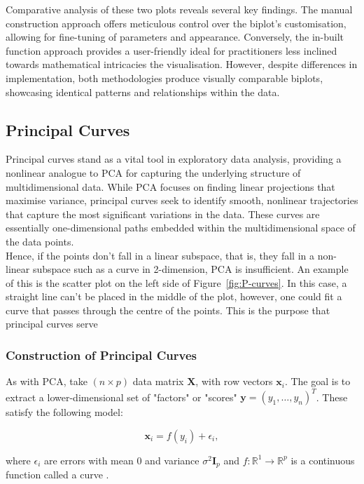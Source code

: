 \documentclass{article}\usepackage[]{graphicx}\usepackage[]{xcolor}
\numberwithin{equation}{section}
\begin{document}
\noindent Comparative analysis of these two plots reveals several key findings. The manual construction approach offers meticulous control over the biplot's customisation, allowing for fine-tuning of parameters and appearance. Conversely, the in-built function approach provides a user-friendly ideal for practitioners less inclined towards mathematical intricacies the visualisation. However, despite differences in implementation, both methodologies produce visually comparable biplots, showcasing identical patterns and relationships within the data.

\subsection{Principal Curves}

\noindent Principal curves stand as a vital tool in exploratory data analysis, providing a nonlinear analogue to PCA for capturing the underlying structure of multidimensional data. While PCA focuses on finding linear projections that maximise variance, principal curves seek to identify smooth, nonlinear trajectories that capture the most significant variations in the data. These curves are essentially one-dimensional paths embedded within the multidimensional space of the data points.\\

\noindent Hence, if the points don't fall in a linear subspace, that is, they fall in a non-linear subspace such as a curve in 2-dimension, PCA is insufficient. An example of this is the scatter plot on the left side of Figure~\ref{fig:P-curves}. In this case, a straight line can't be placed in the middle of the plot, however, one could fit a curve that passes through the centre of the points. This is the purpose that principal curves serve

\subsubsection{Construction of Principal Curves}

\noindent As with PCA, take $(n \times p)$ data matrix $\mathbf{X}$, with row vectors $\mathbf{x}_i$. The goal is to extract a lower-dimensional set of "factors" or "scores" $\mathbf{y} = (y_1, \dots, y_n)^T$. These satisfy the following model:

\[
\mathbf{x}_i = f(y_i) + \epsilon_i, 
\]

\noindent where $\epsilon_i$ are errors with mean 0 and variance $\sigma^2 \mathbf{I}_p$ and $f: \mathbb{R}^1 \rightarrow \mathbb{R}^p$ is a continuous function called a curve \cite{jolliffe2003principal}.\\
\end{document}
